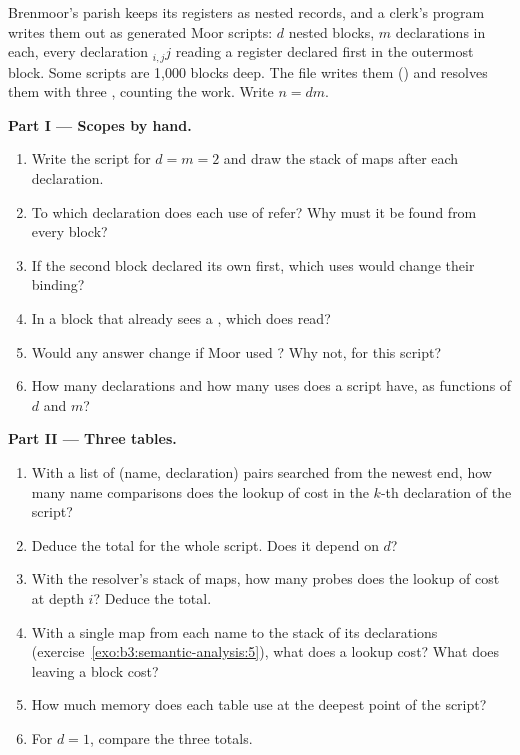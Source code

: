 \begin{problem}\label{pb:b3:semantic-analysis:1}
Brenmoor's parish keeps its registers as nested records, and a clerk's program writes them out as generated Moor scripts: $d$ nested blocks, $m$ declarations in each, every declaration $_{i,j}$$j$\code{;} reading a register  declared first in the outermost block. Some scripts are 1,000 blocks deep. The file  writes them () and resolves them with three , counting the work. Write $n = dm$.

\medskip\noindent\textbf{Part I --- Scopes by hand.}
\begin{enumerate}
\item Write the script for $d = m = 2$ and draw the stack of maps after each declaration.
\item To which declaration does each use of  refer? Why must it be found from every block?
\item If the second block declared its own  first, which uses would change their binding?
\item In a block that already sees a , which  does  read?
\item Would any answer change if Moor used ? Why not, for this script?
\item How many declarations and how many uses does a script have, as functions of $d$ and $m$?
\end{enumerate}

\medskip\noindent\textbf{Part II --- Three tables.}
\begin{enumerate}[resume]
\item With a list of (name, declaration) pairs searched from the newest end, how many name comparisons does the lookup of  cost in the $k$-th declaration of the script?
\item Deduce the total for the whole script. Does it depend on $d$?
\item With the resolver's stack of maps, how many probes does the lookup of  cost at depth $i$? Deduce the total.
\item With a single map from each name to the stack of its declarations (exercise~\ref{exo:b3:semantic-analysis:5}), what does a lookup cost? What does leaving a block cost?
\item How much memory does each table use at the deepest point of the script?
\item For $d = 1$, compare the three totals.
\end{enumerate}


\end{problem}

